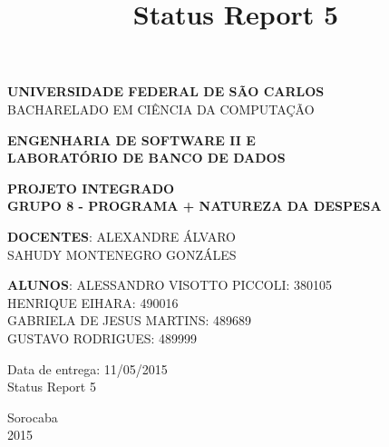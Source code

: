 \documentclass[a4paper,12pt]{article}
\title{Status Report 5}
\begin{document}
\renewcommand*\sectionmark[1]{\markboth{#1}{}}
\renewcommand*\subsectionmark[1]{\markboth{#1}{}}


\begin{titlepage}
\begin{center}
{\bf \large UNIVERSIDADE FEDERAL DE SÃO CARLOS}\\[0.2cm]
{\large BACHARELADO EM CIÊNCIA DA COMPUTAÇÃO}\\[0.2cm]

\end{center}

\vfill
\begin{center}
{\bf \large ENGENHARIA DE SOFTWARE II E\\LABORATÓRIO DE BANCO DE DADOS}\\[3.2cm]
\end{center}

\begin{center}
{\bf \LARGE PROJETO INTEGRADO}\\[0.3cm]
{\bf \Large GRUPO 8 - PROGRAMA + NATUREZA DA DESPESA}\\[2.2cm]
\end{center}

\vfill
\begin{flushright}
{\large \textbf{DOCENTES}: ALEXANDRE ÁLVARO}\\[0.2cm]
{\large SAHUDY MONTENEGRO GONZÁLES}\\[0.5cm]
\end{flushright}

\vfill
\begin{flushright}
{\large {\bf ALUNOS}: ALESSANDRO VISOTTO PICCOLI: 380105}\\[0.15cm]
{\large HENRIQUE EIHARA: 490016}\\[0.15cm]
{\large GABRIELA DE JESUS MARTINS: 489689}\\[0.15cm]
{\large GUSTAVO RODRIGUES: 489999}\\[0.15cm]
\end{flushright}

\vfill
\begin{flushright}
{\large Data de entrega: 11/05/2015}\\[0.2cm]
{\large Status Report 5}\\[2.0cm]
\end{flushright}

\begin{center}
{\large Sorocaba}\\[0.2cm]
{\large 2015}
\end{center}

\end{titlepage}
\end{document}
